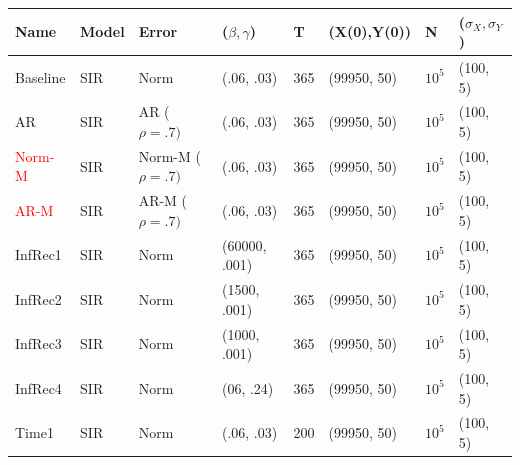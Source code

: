 \documentclass[12pt]{article}
\begin{document}
\begin{table}[]
\centering
\begin{tabular}{@{}llllllll@{}}
\toprule
\textbf{Name} & \textbf{Model} & \textbf{Error} & \textbf{($\beta, \gamma$)} & \textbf{T} & \textbf{(X(0),Y(0))} & \textbf{N} & \textbf{($\sigma_X, \sigma_Y$)} \\ \midrule
  Baseline        & SIR      &   Norm             & (.06, .03)                          &     365       &  (99950, 50)                    &  $10^5$          &(100, 5)                                \\ \midrule
  AR       & SIR      &   AR ($\rho=.7)$             & (.06, .03)                          &     365       &  (99950, 50)                    &  $10^5$          &(100, 5)                            \\ \midrule
  \textcolor{red}{Norm-M}      & SIR      &   Norm-M ($\rho=.7)$             & (.06, .03)                          &     365       &  (99950, 50)                    &  $10^5$          &(100, 5)                            \\ \midrule
   \textcolor{red}{AR-M}       & SIR      &   AR-M ($\rho=.7)$             & (.06, .03)                          &     365       &  (99950, 50)                    &  $10^5$          &(100, 5)                            \\ \midrule
  InfRec1       & SIR      &   Norm             & (60000, .001)                          &     365       &  (99950, 50)                    &  $10^5$          &(100, 5)\\
  InfRec2      & SIR      &   Norm             & (1500, .001)                          &     365       &  (99950, 50)                    &  $10^5$          &(100, 5)                                \\
  InfRec3      & SIR      &   Norm             & (1000, .001)                          &     365       &  (99950, 50)                    &  $10^5$          &(100, 5)                                \\
InfRec4      & SIR      &   Norm             & (06, .24)                          &     365       &  (99950, 50)                    &  $10^5$          &(100, 5)                                \\ \midrule
  Time1 & SIR &  Norm   & (.06, .03)                          &     200       &  (99950, 50)                    &  $10^5$          &(100, 5)                                \\

\end{tabular}
\end{table}
\end{document}
